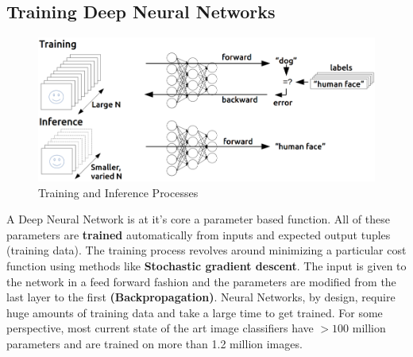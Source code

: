 \documentclass[11pt]{article}
\begin{document}
		
			\subsection{Training Deep Neural Networks}
					\begin{figure}[ht!]
					\includegraphics[width=14cm]{training_inference1.png}
					\caption{Training and Inference Processes\label{fig5}}
				\end{figure}
				A Deep Neural Network is at it's core a parameter based function. All of these parameters are  \textbf{trained} automatically from inputs and expected output tuples (training data). The training process revolves around minimizing a particular cost function using methods like \textbf{Stochastic gradient descent}. The input is given to the network in a feed forward fashion and the parameters are modified from the last layer to the first \textbf{(Backpropagation)}. Neural Networks, by design, require huge amounts of training data and take a large time to get trained. For some perspective, most current state of the art image classifiers have $> 100$ million parameters and are trained on more than 1.2 million images. 





	


\end{document}
